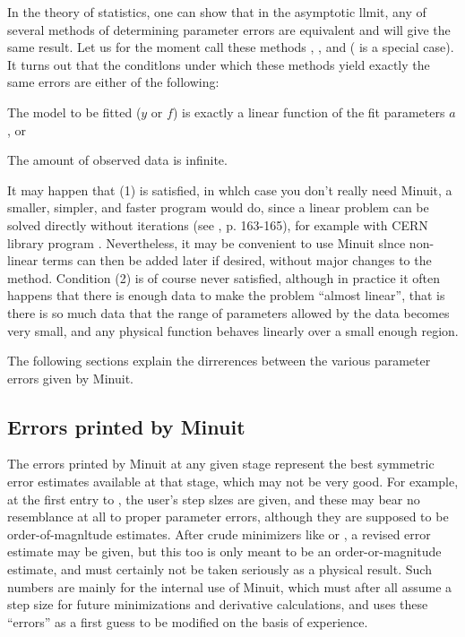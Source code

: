 In the theory of statistics, one can show that in the asymptotic 
llmit, any of several methods of determining parameter errors are 
equivalent and will give the same result. 
Let us for the moment call 
these methods , , and  
( is a special case). 
It turns out that the conditlons under which these methods 
yield exactly the same errors are either of the following:
 
\begin{OL}
\item The model to be fitted ($y$ or $f$) is exactly a linear function of the 
      fit parameters $a$, or
\item The amount of observed data is infinite.
\end{OL}
 
It may happen that (1) is  satisfied, in whlch case you don't really 
need Minuit, a smaller, simpler, and faster program would do, since 
a linear problem can be solved directly without iterations (see \cite{bib-EADIE},
p. 163-165), for example with CERN library program . 
Nevertheless, it may be convenient to use Minuit slnce non-linear 
terms can then be added later if desired, without major changes to 
the method. Condition (2) is of course never satisfied, although in 
practice it often happens that there is enough data to make the 
problem ``almost linear'', that is there is so much data that the 
range of parameters allowed by the data becomes very small, and 
any physical function behaves linearly over a small enough region.
 
The following sections explain the dirrerences between the various 
parameter errors given by Minuit.
 
\subsection{Errors printed by Minuit}
 
The errors printed by Minuit at any given stage represent the best 
symmetric error estimates available at that stage, which may not 
be very good. For example, at the first entry to , the user's step 
slzes are given, and these may bear no resemblance at all to proper 
parameter errors, although they are supposed to be order-of-magnltude estimates. 
After crude minimizers like  or , 
a revised error estimate may be given, but this too is only meant to
be an order-or-magnitude estimate, and must certainly not be 
taken seriously as a physical result. Such numbers are mainly for 
the internal use of Minuit, which must after all assume a step size 
for future minimizations and derivative calculations, and uses these 
``errors'' as a first guess to be modified on the basis of experience.
 
